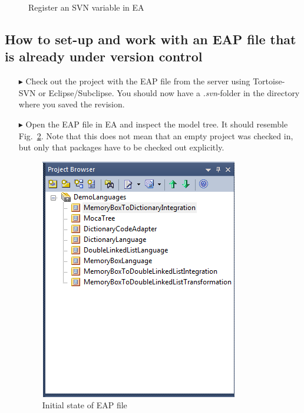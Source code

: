 \begin{figure}[htbp]
\begin{center}
	\caption{Register an SVN variable in EA}
  	\label{fig:advanced-topics-eaSVN-rightclick}
\end{center}
\end{figure}

\subsection{How to set-up and work with an EAP file that is already under version control}

\begin{enumerate}
  \item[$\blacktriangleright$] Check out the project with the EAP file from the server using Tortoise-SVN or Eclipse/Subclipse. 
  You should now have a \textit{.svn}-folder in the directory where you saved the revision.
  \item[$\blacktriangleright$] Open the EAP file in EA and inspect the model tree. 
  It should resemble Fig.~\ref{fig:advanced-topics-eaSVN-initial}.
  Note that this does not mean that an empty project was checked in, but only that packages have to be checked out explicitly.
\begin{figure}[htbp]
\begin{center}
	\includegraphics[height=0.45\textheight]{pics/advancedTopics/eaSVN/DemoLanguages/001.png}
	\caption{Initial state of EAP file}
  	\label{fig:advanced-topics-eaSVN-initial}
\end{center}
\end{figure}


\end{enumerate}
